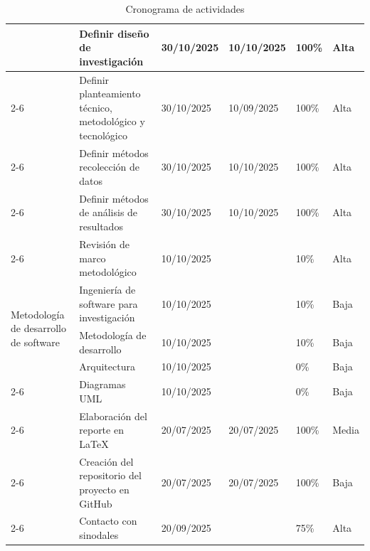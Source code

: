 \documentclass[letterpaper,10pt,oneside]{article}
\begin{document}
\begin{table}[htbp]
\begin{tabular}{|p{}|p{}|p{}|p{}|p{}|p{}|}
		& Definir diseño de investigación & 30/10/2025& 10/10/2025 & 100\% & Alta \\  \cline{2-6}
		
		& Definir planteamiento técnico, metodológico y tecnológico & 30/10/2025 & 10/09/2025 & 100\% & Alta \\  \cline{2-6}
		
		& Definir métodos recolección de datos & 30/10/2025 & 10/10/2025 & 100\% & Alta \\  \cline{2-6}
		
		& Definir métodos de análisis de resultados & 30/10/2025 & 10/10/2025 & 100\% & Alta \\ \cline{2-6}
		
		& Revisión de marco metodológico & 10/10/2025 &  & 10\% & Alta  \\ \hline
		
		\multirow{3}{0.15\textwidth}{\parbox{0.15\textwidth}{\centering Metodología de desarrollo de software}} 
		
		& Ingeniería de software para investigación & 10/10/2025 & & 10\% & Baja \\  \cline{2-6}
		
		& Metodología de desarrollo & 10/10/2025 & & 10\% & Baja \\  \cline{2-6}
		
		& Arquitectura & 10/10/2025 & & 0\% & Baja \\  \cline{2-6}
		
		& Diagramas UML & 10/10/2025 & & 0\% & Baja \\  \cline{2-6} \hline
		
		\multirow{3}{0.15\textwidth}{\parbox{0.15\textwidth}{\centering Generalidades de proyecto}} 
		
		& Elaboración del reporte en LaTeX & 20/07/2025 & 20/07/2025 & 100\% & Media \\  \cline{2-6}
		
		& Creación del repositorio del proyecto en GitHub & 20/07/2025 & 20/07/2025 & 100\% & Baja \\  \cline{2-6}
		
		& Contacto con sinodales & 20/09/2025 & & 75\% & Alta \\  \hline
		
		
	\end{tabular}
	\caption{Cronograma de actividades}
\end{table}


	
	
\end{document}
